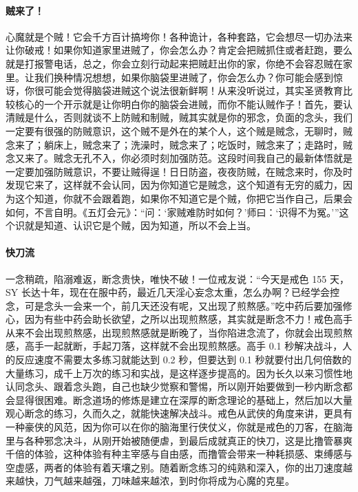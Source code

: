 \paragraph{贼来了！}

心魔就是个贼！它会千方百计搞垮你！各种诡计，各种套路，它会想尽一切办法来让你破戒！如果你知道家里进贼了，你会怎么办？肯定会把贼抓住或者赶跑，要么就是打报警电话，总之，你会立刻行动起来把贼赶出你的家，你绝不会容忍贼在家里。让我们换种情况想想，如果你脑袋里进贼了，你会怎么办？你可能会感到惊讶，你很可能会觉得脑袋进贼这个说法很新鲜啊！从来没听说过，其实圣贤教育比较核心的一个开示就是让你明白你的脑袋会进贼，而你不能认贼作子！首先，要认清贼是什么，否则就谈不上防贼和制贼，贼其实就是你的邪念，负面的念头，我们一定要有很强的防贼意识，这个贼不是外在的某个人，这个贼是贼念，无聊时，贼念来了；躺床上，贼念来了；洗澡时，贼念来了；吃饭时，贼念来了；走路时，贼念又来了。贼念无孔不入，你必须时刻加强防范。这段时间我自己的最新体悟就是一定要加强防贼意识，不要让贼得逞！日日防盗，夜夜防贼，在贼念来时，你及时发现它来了，这样就不会认同，因为你知道它是贼念，这个知道有无穷的威力，因为这个知道，你就不会跟着跑，如果你不知道它是个贼，你把它当作自己，后果会如何，不言自明。《五灯会元》：“问：‘家贼难防时如何？’师曰：‘识得不为冤。’”这个识就是知道、认识它是个贼，因为知道，所以不会上当。

\paragraph{快刀流}

一念稍疏，陷溺难返，断念贵快，唯快不破！一位戒友说：“今天是戒色 155 天，SY 长达十年，现在在服中药，最近几天淫心妄念太重，怎么办啊？已经学会控念，可是念头一会来一个，前几天还没有呢，又出现了煎熬感。”吃中药后要加强修心，因为有些中药会助长欲望，之所以出现煎熬感，其实就是断念不力！戒色高手从来不会出现煎熬感，出现煎熬感就是断晚了，当你陷进念流了，你就会出现煎熬感，高手一起就断，手起刀落，这样就不会出现煎熬感。高手 0.1 秒解决战斗，人的反应速度不需要太多练习就能达到 0.2 秒，但要达到 0.1 秒就要付出几何倍数的大量练习，成千上万次的练习和实战，是这样逐步提高的。因为长久以来习惯性地认同念头、跟着念头跑，自己也缺少觉察和警惕，所以刚开始要做到一秒内断念都会显得很困难。断念道场的修炼是建立在深厚的断念理论的基础上，然后加以大量观心断念的练习，久而久之，就能快速解决战斗。戒色从武侠的角度来讲，更具有一种豪侠的风范，因为你可以在你的脑海里行侠仗义，你就是戒色的刀客，在脑海里与各种邪念决斗，从刚开始被随便虐，到最后成就真正的快刀，这是比撸管暴爽千倍的体验，这种体验有种主宰感与自由感，而撸管会带来一种耗损感、束缚感与空虚感，两者的体验有着天壤之别。随着断念练习的纯熟和深入，你的出刀速度越来越快，刀气越来越强，刀味越来越浓，到时你将成为心魔的克星。

